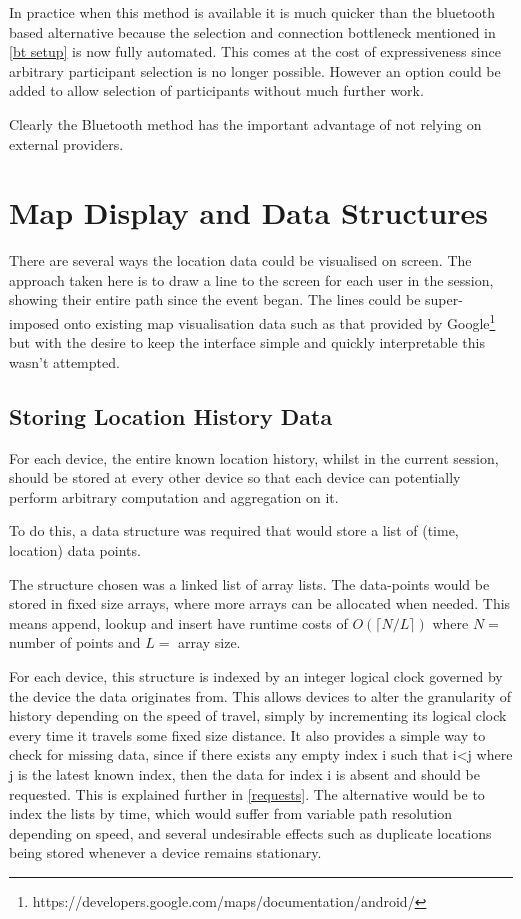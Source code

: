 In practice when this method is available it is much quicker than the bluetooth based alternative because the selection and connection bottleneck mentioned in \ref{bt setup} is now fully automated. This comes at the cost of expressiveness since arbitrary participant selection is no longer possible. However an option could be added to allow selection of participants without much further work.

Clearly the Bluetooth method has the important advantage of not relying on external providers.

\section{Map Display and Data Structures}

There are several ways the location data could be visualised on screen. The approach taken here is to draw a line to the screen for each user in the session, showing their entire path since the event began. The lines could be super-imposed onto existing map visualisation data such as that provided by Google\footnote{https://developers.google.com/maps/documentation/android/} but with the desire to keep the interface simple and quickly interpretable this wasn't attempted.

\subsection{Storing Location History Data}

For each device, the entire known location history, whilst in the current session, should be stored at every other device so that each device can potentially perform arbitrary computation and aggregation on it.

To do this, a data structure was required that would store a list of (time, location) data points.

The structure chosen was a linked list of array lists. The data-points would be stored in fixed size arrays, where more arrays can be allocated when needed. This means append, lookup and insert have runtime costs of $ O(\lceil N/L \rceil ) $ where $ N = $ number of points and $ L =$ array size.

For each device, this structure is indexed by an integer logical clock governed by the device the data originates from. This allows devices to alter the granularity of history depending on the speed of travel, simply by incrementing its logical clock every time it travels some fixed size distance. It also provides a simple way to check for missing data, since if there exists any empty index i such that i<j where j is the latest known index, then the data for index i is absent and should be requested. This is explained further in \ref{requests}.
The alternative would be to index the lists by time, which would suffer from variable path resolution depending on speed, and several undesirable effects such as duplicate locations being stored whenever a device remains stationary.

